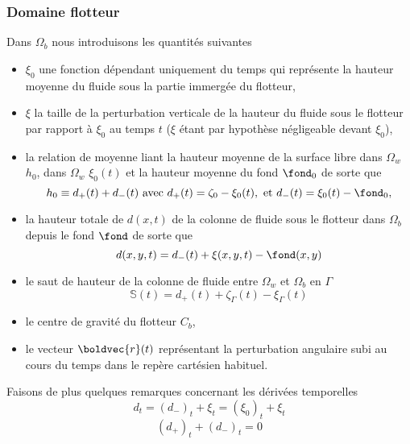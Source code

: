 \subsubsection{Domaine flotteur}
Dans $\Omega_b$ nous introduisons les quantités suivantes
\begin{itemize}[label=$\mybullet$]
	\item $\xi_0$ une fonction dépendant uniquement du temps qui représente la hauteur moyenne du fluide sous la partie immergée du flotteur, 
	\item $\xi$ la taille de la perturbation verticale de la hauteur du fluide sous le flotteur par rapport à $\xi_0$ au temps $t$ ($\xi$ étant par hypothèse négligeable devant $\xi_0$),
	\item la relation de moyenne liant la hauteur moyenne de la surface libre dans $\Omega_w$ $h_0$, dans $\Omega_w$ $\xi_0(t)$ et la hauteur moyenne du fond $\fond_0$ de sorte que
	\begin{equation}
	h_0 \equiv d_{+}(t) + d_{-}(t) \text{ avec } d_{+}(t) = \zeta_0 - \xi_0(t), \text{ et } d_{-}(t) = \xi_0(t) - \fond_0,
	\end{equation} 
	\item la hauteur totale de $d(x, t)$ de la colonne de fluide sous le flotteur dans $\Omega_b$ depuis le fond $\fond$ de sorte que
	\begin{equation}
		d(x, y, t) = d_{-}(t) + \xi(x, y, t) - \fond(x, y)
	\end{equation}
	\item le saut de hauteur de la colonne de fluide entre $\Omega_w$ et $\Omega_b$ en $\Gamma$
	\begin{equation}
		\mathbb{S}(t) = d_{+}(t) + \zeta_{\Gamma}(t) - \xi_{\Gamma}(t)
	\end{equation}
	\item le centre de gravité du flotteur $C_b$,
	\item le vecteur $\boldvec{r}(t)$ représentant la perturbation angulaire subi au cours du temps dans le repère cartésien habituel.
\end{itemize}

\begin{refe}
	Faisons de plus quelques remarques concernant les dérivées temporelles
	\begin{equation}
		d_t = \left(d_{-}\right)_t + \xi_t = \left(\xi_0\right)_t + \xi_t
	\end{equation}
	\begin{equation}
		\left(d_{+}\right)_t + \left(d_{-}\right)_t = 0
	\end{equation}
\end{refe}

